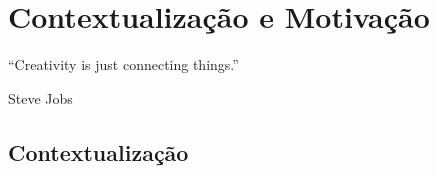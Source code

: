 \chapter{Contextualização e Motivação}

\begin{flushright}
	\begin{quotebox50}
		\large
		“Creativity is just connecting things.”

		\tcblower
		Steve Jobs
	\end{quotebox50}
\end{flushright}


\section{Contextualização}





